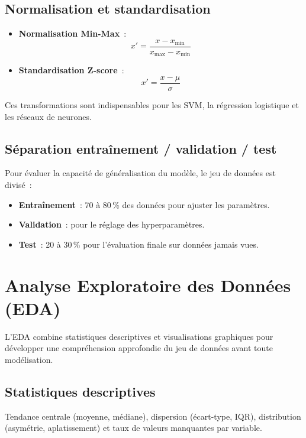\subsection{Normalisation et standardisation}
\begin{itemize}[leftmargin=1.5cm, itemsep=4pt]
  \item \textbf{Normalisation Min-Max}~:
  \[ x' = \frac{x - x_{\min}}{x_{\max} - x_{\min}} \]
  \item \textbf{Standardisation Z-score}~:
  \[ x' = \frac{x - \mu}{\sigma} \]
\end{itemize}
Ces transformations sont indispensables pour les SVM, la régression logistique et les réseaux de neurones.

\subsection{Séparation entraînement / validation / test}

Pour évaluer la capacité de généralisation du modèle, le jeu de données est divisé~:
\begin{itemize}[leftmargin=1.5cm]
  \item \textbf{Entraînement}~: 70 à 80\,\% des données pour ajuster les paramètres.
  \item \textbf{Validation}~: pour le réglage des hyperparamètres.
  \item \textbf{Test}~: 20 à 30\,\% pour l'évaluation finale sur données jamais vues.
\end{itemize}

\section{Analyse Exploratoire des Données (EDA)}

L'EDA combine statistiques descriptives et visualisations graphiques pour développer une compréhension approfondie du jeu de données avant toute modélisation.

\subsection{Statistiques descriptives}
Tendance centrale (moyenne, médiane), dispersion (écart-type, IQR), distribution (asymétrie, aplatissement) et taux de valeurs manquantes par variable.

